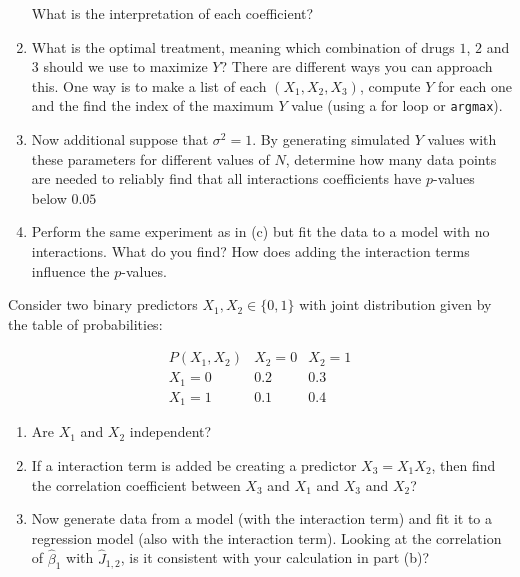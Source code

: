\begin{exercise}
\begin{enumerate}[label=(\alph*)]
What is the interpretation of each coefficient? 
\item 
What is the optimal treatment, meaning which combination of drugs $1$, $2$ and $3$ should we use to maximize $Y$? There are different ways you can approach this. One way is to make a list of each $(X_1,X_2,X_3)$, compute $Y$ for each one and the find the index of the maximum $Y$ value (using a for loop or \verb!argmax!). 
\item Now additional suppose that $\sigma^2 = 1$. 
By generating simulated $Y$ values with these parameters for different values of $N$, determine how many data points are needed to reliably find that all interactions coefficients have $p$-values below $0.05$
\item Perform the same experiment as in (c) but fit the data to a model with no interactions. What do you find? How does adding the interaction terms influence the $p$-values. 
\end{enumerate}
\end{exercise}


\begin{exercise}
Consider two binary predictors \(X_1, X_2 \in \{0,1\}\) with joint distribution given by the table of probabilities:

\[
\begin{array}{c|cc}
P(X_1, X_2) & X_2=0 & X_2=1 \\ \hline
X_1=0 & 0.2 & 0.3 \\
X_1=1 & 0.1 & 0.4
\end{array}
\]

\begin{enumerate}[label=(\alph*)]
\item Are $X_1$ and $X_2$ independent? 
\item If a interaction term is added be creating a predictor $X_3 = X_1X_2$, then find the correlation coefficient between $X_3$ and $X_1$ and $X_3$ and $X_2$? 
\item Now generate data from a model (with the interaction term) and fit it to a regression model (also with the interaction term). Looking at the correlation of $\hat{\beta}_1$ with $\hat{J}_{1,2}$, is it consistent with your calculation in part (b)? 
\end{enumerate}
\end{exercise}


